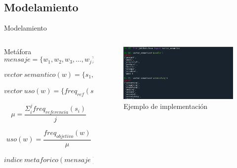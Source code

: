 \documentclass[presentation]{beamer}
\begin{document}
\subsection{Modelamiento}
\label{sec:orgca41ff8}
\begin{frame}[label={sec:org65bed7d}]{Modelamiento}
\begin{columns}
\begin{column}{0.48\columnwidth}
\tiny
    \begin{block}{Metáfora}
\begin{equation}
\label{eq:mensaje}
mensaje = \{ w_1, w_2, w_3, \dots , w_j \}
\end{equation}

\begin{equation}
\label{eq:vector_semantico}
vector\ semantico(w) = \{s_1, s_2, s_3, \dots, s_j \} 
\end{equation}

\begin{equation}
\label{eq:vector_uso}
vector\ uso(w) = \{freq_{ref}(s_1),freq_{ref}(s_2),freq_{ref}(s_3), \dots, freq_{ref}(s_j) \} 
\end{equation}

\begin{equation}
\label{eq:promedio}
\mu = \frac{\Sigma_i^jfreq_{referencia}(s_i)}{j}
\end{equation}


\begin{equation}
\label{eq:uso}
uso(w) = \frac{freq_{objetivo}(w)}{\mu}
\end{equation}


\begin{equation}
\label{eq:indice_metafórico}
indice\ metaforico(mensaje) =  \Sigma_i^j uso(w_i)
\end{equation}
\end{block}
\normalsize
\end{column}
\begin{column}{0.48\columnwidth}
     \begin{figure}
\includegraphics[width=\textwidth]{./assets/codigo_vector_semantico.png}
\caption{Ejemplo de implementación}
\end{figure}


\end{column}
\end{columns}
\end{frame}
\end{document}
